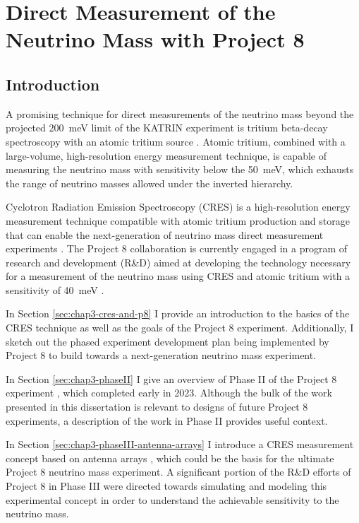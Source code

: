 
\chapter{Direct Measurement of the Neutrino Mass with Project 8}

\section{Introduction}

A promising technique for direct measurements of the neutrino mass beyond the projected $200$~meV limit of the KATRIN experiment \cite{KATRIN:2022kkv} is tritium beta-decay spectroscopy with an atomic tritium source \cite{direct_meas_nu_mass}. Atomic tritium, combined with a large-volume, high-resolution energy measurement technique, is capable of measuring the neutrino mass with sensitivity below the 50~meV, which exhausts the range of neutrino masses allowed under the inverted hierarchy. 

Cyclotron Radiation Emission Spectroscopy (CRES) is a high-resolution energy measurement technique compatible with atomic tritium production and storage that can enable the next-generation of neutrino mass direct measurement experiments \cite{p8originalcres}. The Project 8 collaboration is currently engaged in a program of research and development (R\&D) aimed at developing the technology necessary for a measurement of the neutrino mass using CRES and atomic tritium with a sensitivity of 40~meV \cite{p8snowmass2022}.

In Section \ref{sec:chap3-cres-and-p8} I provide an introduction to the basics of the CRES technique as well as the goals of the Project 8 experiment. Additionally, I sketch out the phased experiment development plan being implemented by Project 8 to build towards a next-generation neutrino mass experiment.

In Section \ref{sec:chap3-phaseII} I give an overview of Phase II of the Project 8 experiment \cite{p8prc2023,p8prl2023}, which completed early in 2023. Although the bulk of the work presented in this dissertation is relevant to designs of future Project 8 experiments, a description of the work in Phase II provides useful context.

In Section \ref{sec:chap3-phaseIII-antenna-arrays} I introduce a CRES measurement concept based on antenna arrays \cite{p8jugaad}, which could be the basis for the ultimate Project 8 neutrino mass experiment. A significant portion of the R\&D efforts of Project 8 in Phase III were directed towards simulating and modeling this experimental concept in order to understand the achievable sensitivity to the neutrino mass.

